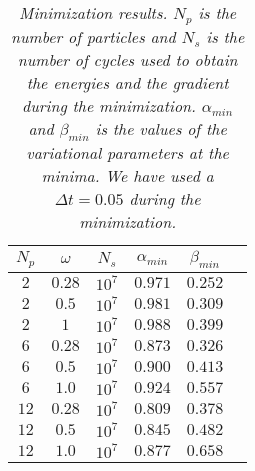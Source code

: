 \documentclass[a4paper,10pt,twocolumn]{article} %
\begin{document}
\begin{table}[h!]
\begin{center}
\begin{tabular}{|c|c|c|c|c|c|}
\hline
$N_{p}$ & $\omega$ & $N_{s}$ & $\alpha_{min}$ & $\beta_{min}$ \\ 
\hline
\hline
 $2$  & $0.28$ & $10^7$ & $0.971$ & $0.252$ \\ 
 $2$  & $0.5$  & $10^7$ & $0.981$ & $0.309$ \\ 
 $2$  & $1$    & $10^7$ & $0.988$ & $0.399$ \\ 	 
\hline
 $6$  & $0.28$ & $10^7$ & $0.873$ & $0.326$ \\ 
 $6$  & $0.5$  & $10^7$ & $0.900$ & $0.413$ \\ 
 $6$  & $1.0$  & $10^7$ & $0.924$ & $0.557$ \\ 
\hline
 $12$ & $0.28$ & $10^7$ & $0.809$ & $0.378$ \\ 
 $12$ & $0.5$  & $10^7$ & $0.845$ & $0.482$ \\ 
 $12$ & $1.0$  & $10^7$ & $0.877$ & $0.658$ \\ 
\hline
\end{tabular}
\end{center}
\caption{{\it 
	Minimization results. $N_p$ is the number of particles and $N_s$ is the number of cycles used to obtain the energies and the gradient during the minimization.
	$\alpha_{min}$ and $\beta_{min}$ is the values of the variational parameters at the minima. 
	We have used a $\Delta t=0.05$ during the minimization. 
}}
\label{tab1}
\end{table}
\end{document}
